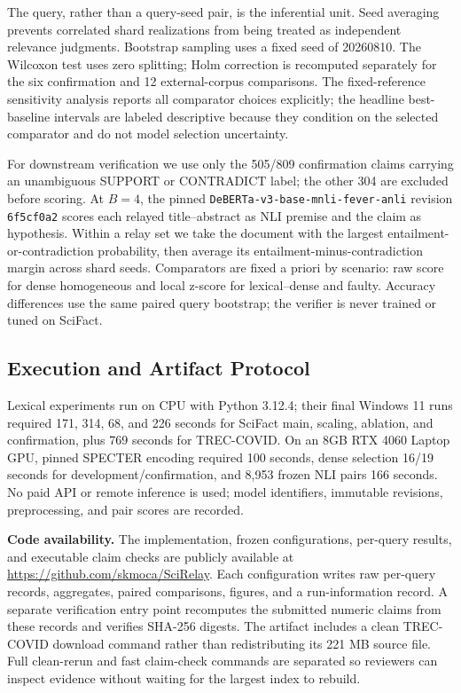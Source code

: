 \documentclass[sigconf]{acmart}
\begin{document}
The query, rather than a query-seed pair, is the inferential unit. Seed averaging prevents correlated shard realizations from being treated as independent relevance judgments. Bootstrap sampling uses a fixed seed of 20260810. The Wilcoxon test uses zero splitting; Holm correction is recomputed separately for the six confirmation and 12 external-corpus comparisons. The fixed-reference sensitivity analysis reports all comparator choices explicitly; the headline best-baseline intervals are labeled descriptive because they condition on the selected comparator and do not model selection uncertainty.

For downstream verification we use only the 505/809 confirmation claims carrying an unambiguous SUPPORT or CONTRADICT label; the other 304 are excluded before scoring. At $B=4$, the pinned \texttt{DeBERTa-v3-base-mnli-fever-anli} revision \texttt{6f5cf0a2} scores each relayed title--abstract as NLI premise and the claim as hypothesis. Within a relay set we take the document with the largest entailment-or-contradiction probability, then average its entailment-minus-contradiction margin across shard seeds. Comparators are fixed a priori by scenario: raw score for dense homogeneous and local z-score for lexical--dense and faulty. Accuracy differences use the same paired query bootstrap; the verifier is never trained or tuned on SciFact.

\subsection{Execution and Artifact Protocol}

Lexical experiments run on CPU with Python 3.12.4; their final Windows 11 runs required 171, 314, 68, and 226 seconds for SciFact main, scaling, ablation, and confirmation, plus 769 seconds for TREC-COVID. On an 8GB RTX 4060 Laptop GPU, pinned SPECTER encoding required 100 seconds, dense selection 16/19 seconds for development/confirmation, and 8,953 frozen NLI pairs 166 seconds. No paid API or remote inference is used; model identifiers, immutable revisions, preprocessing, and pair scores are recorded.

\textbf{Code availability.} The implementation, frozen configurations, per-query results, and executable claim checks are publicly available at \url{https://github.com/skmoca/SciRelay}. Each configuration writes raw per-query records, aggregates, paired comparisons, figures, and a run-information record. A separate verification entry point recomputes the submitted numeric claims from these records and verifies SHA-256 digests. The artifact includes a clean TREC-COVID download command rather than redistributing its 221 MB source file. Full clean-rerun and fast claim-check commands are separated so reviewers can inspect evidence without waiting for the largest index to rebuild.
\end{document}
